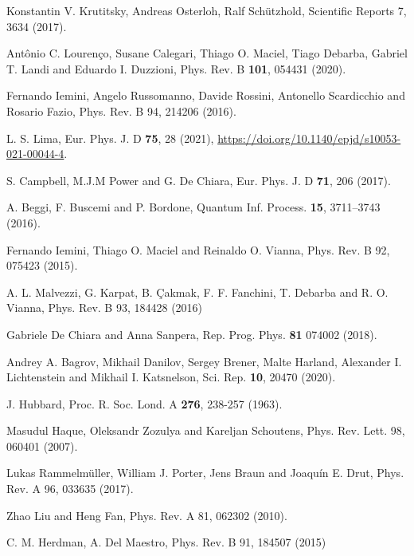 \documentclass[prb,reprint,showpacs,twocolumn,superscriptaddress]{revtex4-2}
\newcommand{\red}[1]{\textcolor{red}{#1}}
\begin{document}
\begin{thebibliography}{99}
 Konstantin V. Krutitsky, Andreas Osterloh, Ralf Schützhold,
Scientific Reports 7, 3634 (2017).


 Antônio C. Lourenço, Susane Calegari, Thiago O. Maciel, Tiago Debarba, Gabriel T. Landi and Eduardo I. Duzzioni, Phys. Rev. B \textbf{101}, 054431 (2020).


 Fernando Iemini, Angelo Russomanno, Davide Rossini, Antonello Scardicchio and Rosario Fazio, Phys. Rev. B 94, 214206 (2016).

 L. S. Lima, Eur. Phys. J. D \textbf{75}, 28 (2021), \url{https://doi.org/10.1140/epjd/s10053-021-00044-4}. 

 S. Campbell, M.J.M Power and G. De Chiara, Eur. Phys. J. D \textbf{71}, 206 (2017). 

  A. Beggi, F. Buscemi and P. Bordone,
Quantum Inf. Process. \textbf{15}, 3711–3743 (2016).

 Fernando Iemini, Thiago O. Maciel and Reinaldo O. Vianna,
Phys. Rev. B 92, 075423 (2015).

 A. L. Malvezzi, G. Karpat, B. Çakmak, F. F. Fanchini, T. Debarba and R. O. Vianna,
Phys. Rev. B 93, 184428 (2016)

 Gabriele De Chiara and Anna Sanpera, Rep. Prog. Phys. \textbf{81} 074002 (2018). 

 Andrey A. Bagrov, Mikhail Danilov, Sergey Brener, Malte Harland, Alexander I. Lichtenstein and Mikhail I. Katsnelson, 
Sci. Rep. \textbf{10}, 20470 (2020).

 J. Hubbard, Proc. R. Soc. Lond. A
\textbf{276}, 238-257 (1963).




 Masudul Haque, Oleksandr Zozulya and Kareljan Schoutens,
Phys. Rev. Lett. 98, 060401 (2007).

 Lukas Rammelmüller, William J. Porter, Jens Braun and Joaquín E. Drut,
Phys. Rev. A 96, 033635 (2017).


 Zhao Liu and Heng Fan,
Phys. Rev. A 81, 062302 (2010).

 C. M. Herdman, A. Del Maestro,
Phys. Rev. B 91, 184507 (2015)


\end{thebibliography}
\end{document}
